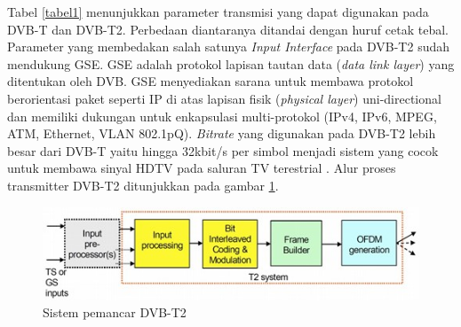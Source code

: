 Tabel \ref{tabel1} menunjukkan parameter transmisi yang dapat digunakan pada DVB-T dan DVB-T2. Perbedaan diantaranya ditandai dengan huruf cetak tebal. Parameter yang membedakan salah satunya \textit{Input Interface} pada DVB-T2 sudah mendukung GSE. GSE adalah protokol lapisan tautan data (\textit{data link layer}) yang ditentukan oleh DVB. GSE menyediakan sarana untuk membawa protokol berorientasi paket seperti IP di atas lapisan fisik (\textit{physical layer}) uni-directional dan memiliki dukungan untuk enkapsulasi multi-protokol (IPv4, IPv6, MPEG, ATM, Ethernet, VLAN 802.1pQ). \textit{Bitrate} yang digunakan pada DVB-T2 lebih besar dari DVB-T yaitu hingga 32kbit/s per simbol menjadi sistem yang cocok untuk membawa sinyal HDTV pada saluran TV terestrial \citep{DVBProject2013}. Alur proses transmitter DVB-T2 ditunjukkan pada gambar \ref{Sistem pemancar DVB-T2}.

\begin{figure}[H]
	\vspace{-0.1cm}
	\begin{center}
		\includegraphics[width=0.9\columnwidth]{bab2/Gambar/Sistem pemancar DVB-T2.jpg}
	\end{center}
	\vspace{-0.2cm}
	\caption{Sistem pemancar DVB-T2 \citep{Hou2010}}\label{Sistem pemancar DVB-T2}
\end{figure}

